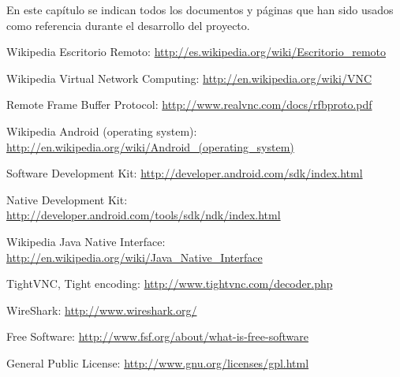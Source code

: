 En este capítulo se indican todos los documentos y páginas que han sido usados como referencia durante el desarrollo del proyecto.

\begin{thebibliography}{11}

Wikipedia Escritorio Remoto: \url{http://es.wikipedia.org/wiki/Escritorio_remoto}

Wikipedia Virtual Network Computing: \url{http://en.wikipedia.org/wiki/VNC}

Remote Frame Buffer Protocol: \url{http://www.realvnc.com/docs/rfbproto.pdf}

Wikipedia Android (operating system): \url{http://en.wikipedia.org/wiki/Android_(operating_system)}

Software Development Kit:  \url{http://developer.android.com/sdk/index.html}

Native Development Kit: \url{http://developer.android.com/tools/sdk/ndk/index.html}

Wikipedia Java Native Interface: \url{http://en.wikipedia.org/wiki/Java_Native_Interface}

TightVNC, Tight encoding: \url{http://www.tightvnc.com/decoder.php}

WireShark: \url{http://www.wireshark.org/}

Free Software: \url{http://www.fsf.org/about/what-is-free-software}

General Public License: \url{http://www.gnu.org/licenses/gpl.html}

\end{thebibliography}
